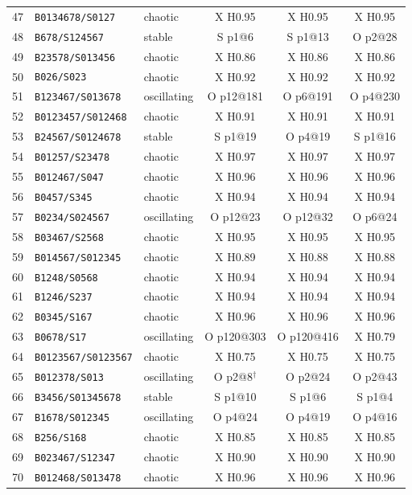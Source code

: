{\begin{longtable}{@{}rllccc@{}}
47 & \texttt{B0134678/S0127} & chaotic & X H0.95 & X H0.95 & X H0.95 \\
48 & \texttt{B678/S124567} & stable & S p1@6 & S p1@13 & O p2@28 \\
49 & \texttt{B23578/S013456} & chaotic & X H0.86 & X H0.86 & X H0.86 \\
50 & \texttt{B026/S023} & chaotic & X H0.92 & X H0.92 & X H0.92 \\
51 & \texttt{B123467/S013678} & oscillating & O p12@181 & O p6@191 & O p4@230 \\
52 & \texttt{B0123457/S012468} & chaotic & X H0.91 & X H0.91 & X H0.91 \\
53 & \texttt{B24567/S0124678} & stable & S p1@19 & O p4@19 & S p1@16 \\
54 & \texttt{B01257/S23478} & chaotic & X H0.97 & X H0.97 & X H0.97 \\
55 & \texttt{B012467/S047} & chaotic & X H0.96 & X H0.96 & X H0.96 \\
56 & \texttt{B0457/S345} & chaotic & X H0.94 & X H0.94 & X H0.94 \\
57 & \texttt{B0234/S024567} & oscillating & O p12@23 & O p12@32 & O p6@24 \\
58 & \texttt{B03467/S2568} & chaotic & X H0.95 & X H0.95 & X H0.95 \\
59 & \texttt{B014567/S012345} & chaotic & X H0.89 & X H0.88 & X H0.88 \\
60 & \texttt{B1248/S0568} & chaotic & X H0.94 & X H0.94 & X H0.94 \\
61 & \texttt{B1246/S237} & chaotic & X H0.94 & X H0.94 & X H0.94 \\
62 & \texttt{B0345/S167} & chaotic & X H0.96 & X H0.96 & X H0.96 \\
63 & \texttt{B0678/S17} & oscillating & O p120@303 & O p120@416 & X H0.79 \\
64 & \texttt{B0123567/S0123567} & chaotic & X H0.75 & X H0.75 & X H0.75 \\
65 & \texttt{B012378/S013} & oscillating & O p2@8$^\dagger$ & O p2@24 & O p2@43 \\
66 & \texttt{B3456/S01345678} & stable & S p1@10 & S p1@6 & S p1@4 \\
67 & \texttt{B1678/S012345} & oscillating & O p4@24 & O p4@19 & O p4@16 \\
68 & \texttt{B256/S168} & chaotic & X H0.85 & X H0.85 & X H0.85 \\
69 & \texttt{B023467/S12347} & chaotic & X H0.90 & X H0.90 & X H0.90 \\
70 & \texttt{B012468/S013478} & chaotic & X H0.96 & X H0.96 & X H0.96 \\

\end{longtable}}

